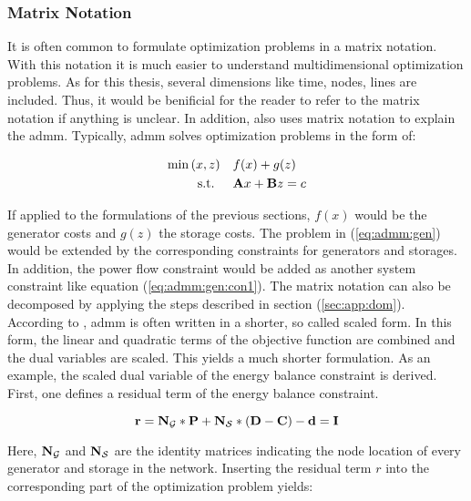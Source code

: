 \subsubsection{Matrix Notation}
\label{sec:app:matrix}

It is often common to formulate optimization problems in a matrix notation. With this notation it is much easier to understand multidimensional optimization problems. As for this thesis, several dimensions like time, nodes, lines are included. Thus, it would be benificial for the reader to refer to the matrix notation if anything is unclear. In addition, \citet{boyd2010} also uses matrix notation to explain the \gls{admm}. Typically, \gls{admm} solves optimization problems in the form of:

\begin{subequations}
	\begin{align}
		\min{(x, z)} \quad & f(x) + g(z) \label{eq:admm:gen}\\
		\text{s.t. } \quad & \vb{A}x + \vb{B}z = c \label{eq:admm:gen:con1}
	\end{align}
\end{subequations}

If applied to the formulations of the previous sections, $f(x)$ would be the generator costs and $g(z)$ the storage costs. The problem in (\ref{eq:admm:gen}) would be extended by the corresponding constraints for generators and storages. In addition, the power flow constraint would be added as another system constraint like equation (\ref{eq:admm:gen:con1}). The matrix notation can also be decomposed by applying the steps described in section (\ref{sec:app:dom}). \\

According to \citet{boyd2010}, \gls{admm} is often written in a shorter, so called scaled form. In this form, the linear and quadratic terms of the objective function are combined and the dual variables are scaled. This yields a much shorter formulation. As an example, the scaled dual variable of the energy balance constraint is derived. First, one defines a residual term of the energy balance constraint.

\begin{equation}
	\vb{r} = \vb{N_\mathcal{G}}*\vb{P} + \vb{N_\mathcal{S}}*(\vb{D} - \vb{C}) - \vb{d} = \vb{I}
\end{equation}

Here, $\vb{N_\mathcal{G}}$ and $\vb{N_\mathcal{S}}$ are the identity matrices indicating the node location of every generator and storage in the network. Inserting the residual term $r$ into the corresponding part of the optimization problem yields:

